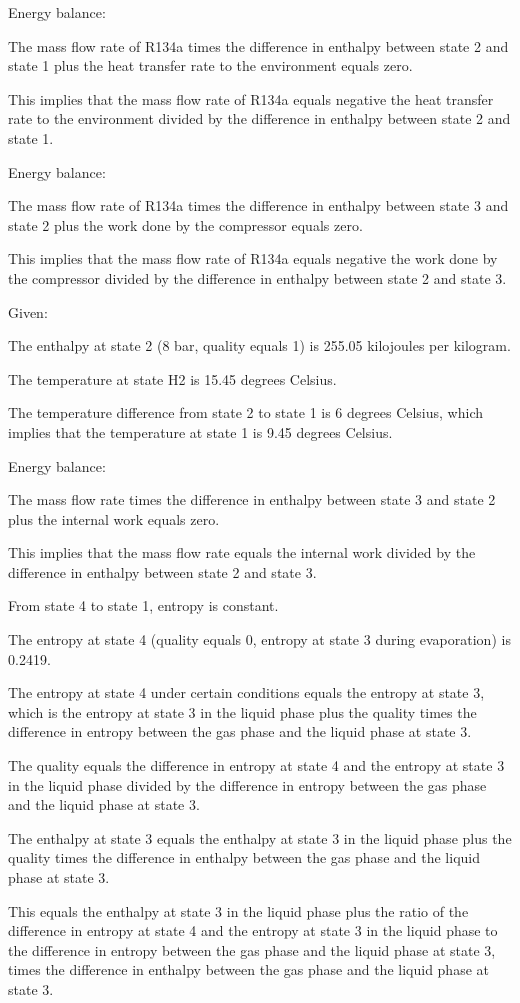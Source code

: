 Energy balance:

The mass flow rate of R134a times the difference in enthalpy between state 2 and state 1 plus the heat transfer rate to the environment equals zero.

This implies that the mass flow rate of R134a equals negative the heat transfer rate to the environment divided by the difference in enthalpy between state 2 and state 1.

Energy balance:

The mass flow rate of R134a times the difference in enthalpy between state 3 and state 2 plus the work done by the compressor equals zero.

This implies that the mass flow rate of R134a equals negative the work done by the compressor divided by the difference in enthalpy between state 2 and state 3.

Given:

The enthalpy at state 2 (8 bar, quality equals 1) is 255.05 kilojoules per kilogram.

The temperature at state H2 is 15.45 degrees Celsius.

The temperature difference from state 2 to state 1 is 6 degrees Celsius, which implies that the temperature at state 1 is 9.45 degrees Celsius.

Energy balance:

The mass flow rate times the difference in enthalpy between state 3 and state 2 plus the internal work equals zero.

This implies that the mass flow rate equals the internal work divided by the difference in enthalpy between state 2 and state 3.

From state 4 to state 1, entropy is constant.

The entropy at state 4 (quality equals 0, entropy at state 3 during evaporation) is 0.2419.

The entropy at state 4 under certain conditions equals the entropy at state 3, which is the entropy at state 3 in the liquid phase plus the quality times the difference in entropy between the gas phase and the liquid phase at state 3.

The quality equals the difference in entropy at state 4 and the entropy at state 3 in the liquid phase divided by the difference in entropy between the gas phase and the liquid phase at state 3.

The enthalpy at state 3 equals the enthalpy at state 3 in the liquid phase plus the quality times the difference in enthalpy between the gas phase and the liquid phase at state 3.

This equals the enthalpy at state 3 in the liquid phase plus the ratio of the difference in entropy at state 4 and the entropy at state 3 in the liquid phase to the difference in entropy between the gas phase and the liquid phase at state 3, times the difference in enthalpy between the gas phase and the liquid phase at state 3.